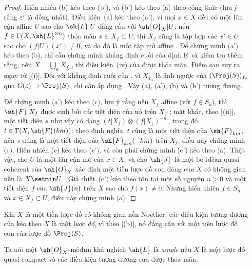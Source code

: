 \documentclass[oneside,10pt]{amsart}
\makeatletter
\newcommand{\ega@arrow}[2]{\mathchoice{#1}{#2}{#2}{#2}}
\renewcommand{\to}{\ega@arrow{\longrightarrow}{\rightarrow}}
\let\EGAOriginalLabel\label
\renewcommand{\label}[1]{\phantomsection\EGAOriginalLabel{#1}}
\makeatother
\begin{document}
\begin{proof}
Hiển nhiên (b) kéo theo (b'), và (b') kéo theo (a) theo công thức  (lưu ý rằng $\varepsilon^\flat$ là đồng nhất).
Điều kiện~(a) kéo theo (a'), vì mọi $x\in X$ đều có một lân cận affine $U$ sao cho $\sh{L}|U$ đẳng cấu với $\sh{O}_X|U$;
nếu $f\in\Gamma(X,\sh{L}^{\otimes n})$ thỏa mãn $x\in X_f\subset U$, thì $X_f$ cũng là tập hợp các $x'\in U$ sao cho $(f|U)(x')\neq0$, và do đó là một tập mở affine .
Để chứng minh (a') kéo theo (b), chỉ cần chứng minh khẳng định cuối của định lý và kiểm tra thêm rằng, nếu $X=\bigcup_\alpha X_{f_\alpha}$, thì điều kiện~(iv) của  được thỏa mãn.
Điểm sau suy ra ngay từ [(i)].
Đối với khẳng định cuối của , vì $X_{f_\alpha}$ là ảnh ngược của $(\Proj(S))_{f_\alpha}$ qua $G(\varepsilon)\to\Proj(S)$, chỉ cần áp dụng .
Vậy (a), (a'), (b) và (b') tương đương.

Để chứng minh (a') kéo theo (c), lưu ý rằng nếu $X_f$ affine (với $f\in S_k$), thì $\sh{F}|X_f$ được sinh bởi các tiết diện của nó trên $X_f$ ;
mặt khác, theo [(ii)], một tiết diện $s$ như vậy có dạng $(t|X_f)\otimes(f|X_f)^{-m}$, trong đó $t\in\Gamma(X,\sh{F}(km))$;
theo định nghĩa, $t$ cũng là một tiết diện của $\sh{F}_{km}$, nên $s$ đúng là một tiết diện của $\sh{F}_{km}(-km)$ trên $X_f$, điều này chứng minh (c).
Hiển nhiên (c) kéo theo (c'), và còn phải chứng minh (c') kéo theo (a).
Thật vậy, cho $U$ là một lân cận mở của $x\in X$, và cho $\sh{J}$ là một bó iđêan quasi-coherent của $\sh{O}_X$ xác định một tiền lược đồ con đóng của $X$ có không gian nền là $X\setmin U$ .
Giả thiết~(c') kéo theo tồn tại một số nguyên $n>0$ và một tiết diện $f$ của $\sh{J}(n)$ trên $X$ sao cho $f(x)\neq0$.
Nhưng hiển nhiên $f\in S_n$ và $x\in X_f\subset U$, điều này chứng minh (a).
\end{proof}

Khi $X$ là một tiền lược đồ có không gian nền Noether, các điều kiện tương đương của  kéo theo $X$ là một \emph{lược đồ}, vì theo [(b)], nó đẳng cấu với một tiền lược đồ con của lược đồ $\Proj(S)$.

\begin{definition}[4.5.3]
\label{II.4.5.3}
Ta nói một $\sh{O}_X$-môđun khả nghịch $\sh{L}$ là \emph{ample} nếu $X$ là một lược đồ quasi-compact và các điều kiện tương đương của  được thỏa mãn.
\end{definition}
\end{document}
